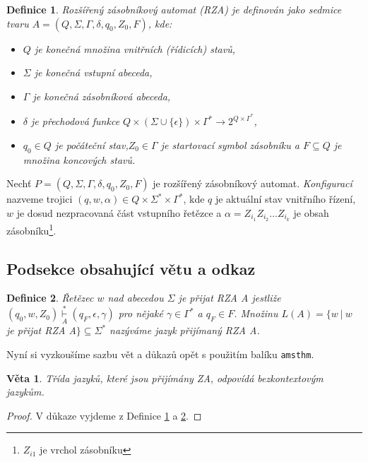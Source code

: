 \documentclass[a4paper,twocolumn,11pt]{article}
\newtheorem{definice1}{Definice}
\newtheorem{veta}{Věta}
\begin{document}
\begin{definice1}
\label{def1}
\textnormal{Rozšířený zásobníkový automat} (RZA) je definován jako sedmice tvaru $A = (Q, \Sigma, \Gamma, \delta, q_0, Z_0, F)$,
kde:
\begin{itemize}
\item $Q$ je konečná množina \textnormal{vnitřních (řídicích) stavů,}
\item $\Sigma$ je konečná \textnormal{vstupní abeceda,}
\item $\Gamma$ je konečná \textnormal{zásobníková abeceda,}
\item $\delta$ je \textnormal{přechodová funkce} 
$Q\times(\Sigma\cup\{\epsilon\})\times\Gamma^*\rightarrow2^{Q\times\Gamma^*}$,

\item $q_0 \in Q$ je \textnormal{počáteční stav},$Z_0 \in \Gamma$ \textnormal{je startovací symbol zásobníku} a $F \subseteq Q$ je množina \textnormal{koncových stavů.}
\end{itemize}
\end{definice1}
Nechť $P = (Q, \Sigma, \Gamma, \delta, q_0, Z_0, F)$ je rozšířený zásobníkový automat. \textit{Konfigurací} nazveme trojici $(q,w,\alpha)\in Q\times\Sigma^*\times\Gamma^*$, kde $q$ je aktuální stav vnitřního řízení,
$w$ je dosud nezpracovaná část vstupního řetězce a $\alpha = Z_{i_1} Z_{i_2} \dots Z_{i_k}$
je obsah zásobníku\footnote{$Z_{i1}$ je vrchol zásobníku}.

\subsection{Podsekce obsahující větu a odkaz}
\begin{definice1}
\label{def2}
\textnormal{Řetězec $w$ nad abecedou $\Sigma$ je přijat RZA}
A jestliže $(q_0, w, Z_0) \underset{A}{\stackrel{*}\vdash} (q_F, \epsilon, \gamma)$ pro nějaké $\gamma\in\Gamma^*$ a $q_F \in F$.
Množinu $L(A) = \{w~|~w$ je přijat RZA A$\}\subseteq\Sigma^\ast$ nazýváme \textnormal{jazyk přijímaný RZA} A.
\end{definice1}

Nyní si vyzkoušíme sazbu vět a důkazů opět s použitím
balíku \texttt{amsthm}.

\begin{veta}
Třída jazyků, které jsou přijímány ZA, odpovídá
\textnormal{bezkontextovým jazykům}.
\end{veta}

\begin{proof}
V důkaze vyjdeme z Definice \ref{def1} a \ref{def2}.
\end{proof}
\end{document}
